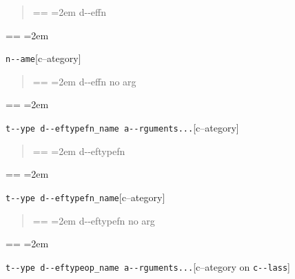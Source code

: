 \documentclass{book}
\makeatletter
\newenvironment{GNUTexinfopreformatted}{%
  \par\obeylines\obeyspaces\frenchspacing
  \parskip=\z@\parindent=\z@}{}
\makeatother
\begin{document}
%
\begin{quote}
\unskip{\parskip=0pt\noindent}%
\begin{GNUTexinfopreformatted}
\leftskip=2em\relax\ttfamily%
d{-}{-}effn
\end{GNUTexinfopreformatted}
\end{quote}
\begin{GNUTexinfopreformatted}
\leftskip=2em\relax\ttfamily%

\end{GNUTexinfopreformatted}
\noindent\texttt{n{-}{-}ame}\hfill[c--ategory]



%
\begin{quote}
\unskip{\parskip=0pt\noindent}%
\begin{GNUTexinfopreformatted}
\leftskip=2em\relax\ttfamily%
d{-}{-}effn no arg
\end{GNUTexinfopreformatted}
\end{quote}
\begin{GNUTexinfopreformatted}
\leftskip=2em\relax\ttfamily%

\end{GNUTexinfopreformatted}
\noindent\texttt{t{-}{-}ype d{-}{-}eftypefn\_name a{-}{-}rguments...}\hfill[c--ategory]



%
\begin{quote}
\unskip{\parskip=0pt\noindent}%
\begin{GNUTexinfopreformatted}
\leftskip=2em\relax\ttfamily%
d{-}{-}eftypefn
\end{GNUTexinfopreformatted}
\end{quote}
\begin{GNUTexinfopreformatted}
\leftskip=2em\relax\ttfamily%

\end{GNUTexinfopreformatted}
\noindent\texttt{t{-}{-}ype d{-}{-}eftypefn\_name}\hfill[c--ategory]



%
\begin{quote}
\unskip{\parskip=0pt\noindent}%
\begin{GNUTexinfopreformatted}
\leftskip=2em\relax\ttfamily%
d{-}{-}eftypefn no arg
\end{GNUTexinfopreformatted}
\end{quote}
\begin{GNUTexinfopreformatted}
\leftskip=2em\relax\ttfamily%

\end{GNUTexinfopreformatted}
\noindent\texttt{t{-}{-}ype d{-}{-}eftypeop\_name a{-}{-}rguments...}\hfill[c--ategory on \texttt{c{-}{-}lass}]
\end{document}
